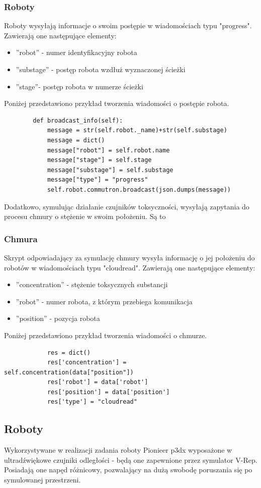 \documentclass[a4paper, 12pt]{article}
\begin{document}
	\subsubsection{Roboty}
	Roboty wysyłają informacje o swoim postępie w wiadomościach typu "progress". Zawierają one następujące elementy:
	\begin{itemize}
	\item ''robot'' - numer identyfikacyjny robota
	\item ''substage'' - postęp robota wzdłuż wyznaczonej ścieżki
	\item ''stage''- postęp robota w numerze ścieżki
	\end{itemize}
	Poniżej przedstawiono przykład tworzenia wiadomości o postępie robota.
	\begin{verbatim}
	    def broadcast_info(self):
	        message = str(self.robot._name)+str(self.substage)
	        message = dict()
	        message["robot"] = self.robot.name
	        message["stage"] = self.stage
	        message["substage"] = self.substage
	        message["type"] = "progress"
	        self.robot.commutron.broadcast(json.dumps(message))
	\end{verbatim}
	Dodatkowo, symulując działanie czujników toksyczności, wysyłają zapytania do procesu chmury o stężenie w swoim położeniu. Są to
	\subsubsection{Chmura}
	Skrypt odpowiadający za symulację chmury wysyła informację o jej położeniu do robotów w wiadomościach typu "cloudread".
	Zawierają one następujące elementy:
	\begin{itemize}
	\item ''concentration'' - stężenie toksycznych substancji
	\item ''robot'' - numer robota, z którym przebiega komunikacja
	\item ''position'' - pozycja robota
	\end{itemize}
	Poniżej przedstawiono przykład tworzenia wiadomości o chmurze.
	\begin{verbatim}
	        res = dict()
	        res['concentration'] = self.concentration(data["position"])
	        res['robot'] = data['robot']
	        res['position'] = data['position']
	        res['type'] = "cloudread"
	\end{verbatim}
	
	
	\subsection{Roboty}
	Wykorzystywane w realizacji zadania roboty Pionieer p3dx wyposażone w ultradźwiękowe czujniki odległości - będą one zapewnione przez symulator V-Rep. Posiadają one napęd różnicowy, pozwalający na dużą swobodę poruszania się po symulowanej przestrzeni.
	
\end{document}
